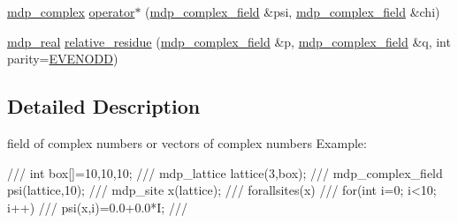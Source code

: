 \begin{DoxyCompactItemize}
\item 
\hyperlink{classmdp__complex}{mdp\_\-complex} \hyperlink{classmdp__complex__field_a11f474ce79caba1227bcf83b2be3424c}{operator$\ast$} (\hyperlink{classmdp__complex__field}{mdp\_\-complex\_\-field} \&psi, \hyperlink{classmdp__complex__field}{mdp\_\-complex\_\-field} \&chi)
\item 
\hyperlink{mdp__global__vars_8h_a049e4c1d4e74d644878a42f9909463e4}{mdp\_\-real} \hyperlink{classmdp__complex__field_a0936375b6edd3f01728d16ac38c76c32}{relative\_\-residue} (\hyperlink{classmdp__complex__field}{mdp\_\-complex\_\-field} \&p, \hyperlink{classmdp__complex__field}{mdp\_\-complex\_\-field} \&q, int parity=\hyperlink{mdp__global__vars_8h_a4c9de81f2de5a74b588107b6c0afb9ee}{EVENODD})
\end{DoxyCompactItemize}


\subsection{Detailed Description}
field of complex numbers or vectors of complex numbers Example: \begin{DoxyVerb}
///    int box[]={10,10,10};
///    mdp_lattice lattice(3,box);
///    mdp_complex_field psi(lattice,10);
///    mdp_site x(lattice);
///    forallsites(x)
///      for(int i=0; i<10; i++)
///         psi(x,i)=0.0+0.0*I;
/// \end{DoxyVerb}
 

